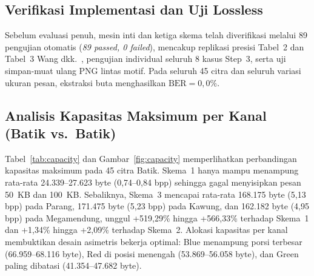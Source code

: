 \documentclass[12pt,journal]{IEEEtran}
\begin{document}
\subsection{Verifikasi Implementasi dan Uji Lossless}
Sebelum evaluasi penuh, mesin inti dan ketiga skema telah diverifikasi melalui 89 pengujian otomatis (\textit{89 passed, 0 failed}), mencakup replikasi presisi Tabel~2 dan Tabel~3 Wang dkk.~\cite{wang2008high}, pengujian individual seluruh 8 kasus Step~3, serta uji simpan-muat ulang PNG lintas motif. Pada seluruh 45 citra dan seluruh variasi ukuran pesan, ekstraksi buta menghasilkan $\text{BER} = 0{,}0\%$.

\subsection{Analisis Kapasitas Maksimum per Kanal (Batik vs.\ Batik)}
Tabel~\ref{tab:capacity} dan Gambar~\ref{fig:capacity} memperlihatkan perbandingan kapasitas maksimum pada 45 citra Batik. Skema~1 hanya mampu menampung rata-rata 24.339--27.623 byte (0,74--0,84 bpp) sehingga gagal menyisipkan pesan 50~KB dan 100~KB. Sebaliknya, Skema~3 mencapai rata-rata 168.175 byte (5,13 bpp) pada Parang, 171.475 byte (5,23 bpp) pada Kawung, dan 162.182 byte (4,95 bpp) pada Megamendung, unggul +519,29\% hingga +566,33\% terhadap Skema~1 dan +1,34\% hingga +2,09\% terhadap Skema~2. Alokasi kapasitas per kanal membuktikan desain asimetris bekerja optimal: Blue menampung porsi terbesar (66.959--68.116 byte), Red di posisi menengah (53.869--56.058 byte), dan Green paling dibatasi (41.354--47.682 byte).
\end{document}
